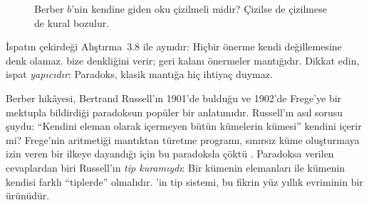 \begin{figure}[htbp]
\centering
{}
\caption{Berber $b$'nin kendine giden oku çizilmeli midir? Çizilse de
çizilmese de kural bozulur.}
\label{fig:berber}
\end{figure}


\noindent İspatın çekirdeği Alıştırma~3.8 ile aynıdır: Hiçbir önerme
kendi değillemesine denk olamaz.  bize
 denkliğini verir; geri kalanı
önermeler mantığıdır. Dikkat edin, ispat \emph{yapıcıdır}: Paradoks,
klasik mantığa hiç ihtiyaç duymaz.

\begin{tarihce}
Berber hikâyesi, Bertrand Russell'ın 1901'de bulduğu ve 1902'de Frege'ye
bir mektupla bildirdiği paradoksun popüler bir anlatımıdır. Russell'ın
asıl sorusu şuydu: ``Kendini eleman olarak içermeyen bütün kümelerin
kümesi'' kendini içerir mi? Frege'nin aritmetiği mantıktan türetme
programı, sınırsız küme oluşturmaya izin veren bir ilkeye dayandığı için
bu paradoksla çöktü \citep{vanheijenoort1967}. Paradoksa verilen
cevaplardan biri Russell'ın \emph{tip kuramıydı}: Bir kümenin elemanları
ile kümenin kendisi farklı ``tiplerde'' olmalıdır. \Lean{}'in tip
sistemi, bu fikrin yüz yıllık evriminin bir ürünüdür.
\end{tarihce}

